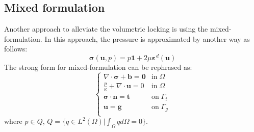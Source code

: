 \subsection{Mixed formulation}
Another approach to alleviate the volumetric locking is using the mixed-formulation. In this approach, the pressure is approximated by another way as follows:
\begin{equation}\label{stress_mix}
\boldsymbol \sigma(\boldsymbol u, p) = p \boldsymbol 1 + 2\mu \boldsymbol \varepsilon^d(\boldsymbol u)
\end{equation}
The strong form for mixed-formulation can be rephrased as:
\begin{equation}\label{strong_mix}
\begin{cases}
    \nabla \cdot \boldsymbol \sigma + \boldsymbol b = \boldsymbol 0 & \mathrm{in} \; \Omega \\
    \frac{p}{\kappa} + \nabla \cdot \boldsymbol u = 0 & \mathrm{in} \; \Omega \\
    \boldsymbol \sigma \cdot \boldsymbol n = \boldsymbol t & \mathrm{on} \; \Gamma_t \\
    \boldsymbol u = \boldsymbol g & \mathrm{on} \; \Gamma_g \\
\end{cases}
\end{equation}
where $p\in Q$, $Q = \{q \in L^2(\Omega) \vert \int_{\Omega} q d\Omega = 0\}$.

